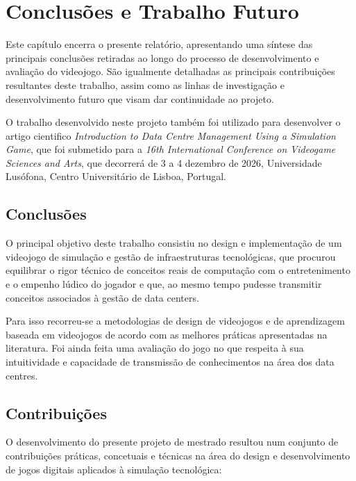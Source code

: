 \chapter{Conclusões e Trabalho Futuro}
\label{cap6}

Este capítulo encerra o presente relatório, apresentando uma síntese das principais conclusões retiradas ao longo do processo de desenvolvimento e avaliação do videojogo. São igualmente detalhadas as principais contribuições resultantes deste trabalho, assim como as linhas de investigação e desenvolvimento futuro que visam dar continuidade ao projeto.

O trabalho desenvolvido neste projeto também foi utilizado para desenvolver o artigo cientifico \textit{Introduction to Data Centre Management Using a Simulation Game}, que foi submetido para a \textit{16th International Conference on Videogame Sciences and Arts}, que decorrerá de 3 a 4 dezembro de 2026, Universidade Lusófona, Centro Universitário de Lisboa, Portugal.


\section{Conclusões}
\label{sec6_1}

O principal objetivo deste trabalho consistiu no design e implementação de um videojogo de simulação e gestão de infraestruturas tecnológicas, que procurou equilibrar o rigor técnico de conceitos reais de computação com o entretenimento e o empenho lúdico do jogador e que, ao mesmo tempo pudesse transmitir conceitos associados à gestão de data centers.

Para isso recorreu-se a metodologias de design de videojogos e de aprendizagem baseada em videojogos de acordo com as melhores práticas apresentadas na literatura. Foi ainda feita uma avaliação do jogo no que respeita à sua intuitividade e capacidade de transmissão de conhecimentos na área dos data centres.


\section{Contribuições}
\label{sec6_2}

O desenvolvimento do presente projeto de mestrado resultou num conjunto de contribuições práticas, concetuais e técnicas na área do design e desenvolvimento de jogos digitais aplicados à simulação tecnológica:

